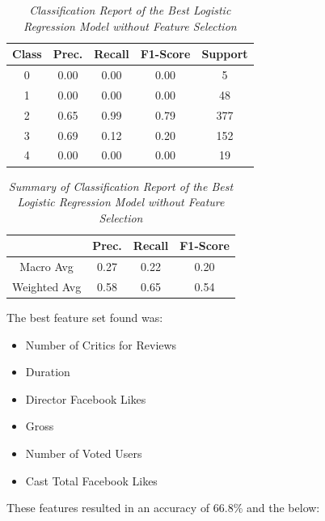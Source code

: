 \documentclass[11pt]{article}
\begin{document}
\begin{table}[!ht]
    \begin{center}
        \begin{tabular}{c|c|c|c|c}			
            \hline
            Class & Prec. & Recall & F1-Score & Support \\
            \hline\hline
            0 & 0.00 & 0.00 & 0.00 & 5 \\
            1 & 0.00 & 0.00 & 0.00 & 48 \\
            2 & 0.65 & 0.99 & 0.79 & 377 \\
            3 & 0.69 & 0.12 & 0.20 & 152 \\
            4 & 0.00 & 0.00 & 0.00 & 19\\
                \hline
        \end{tabular}

        \caption{\textit{Classification Report of the Best Logistic Regression Model without Feature Selection}}
        \label{logr-report}

    \end{center}
\end{table}
\begin{table}[!ht]
    \begin{center}
        \begin{tabular}{c||c|c|c}			
            \hline
             & Prec. & Recall & F1-Score \\
            \hline\hline
            Macro Avg & 0.27 & 0.22 & 0.20 \\
            Weighted Avg & 0.58 & 0.65 & 0.54 \\
                \hline
        \end{tabular}

        \caption{\textit{Summary of Classification Report of the Best Logistic Regression Model without Feature Selection}}
        \label{logr-report-sum}

    \end{center}
\end{table}
\noindent
The best feature set found was:
\begin{itemize}
    \item Number of Critics for Reviews
    \item Duration
    \item Director Facebook Likes
    \item Gross
    \item Number of Voted Users
    \item Cast Total Facebook Likes
\end{itemize}
\noindent
These features resulted in an accuracy of 66.8\% and the below:
\end{document}
